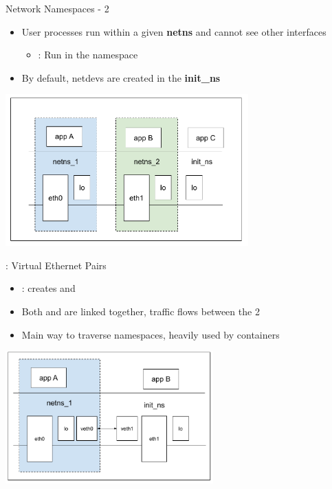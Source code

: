 \begin{frame}{Network Namespaces - 2}
	\begin{itemize}
		\item User processes run within a given \textbf{netns} and cannot see other interfaces
			\begin{itemize}
				\item {} : Run  in the  namespace
			\end{itemize}

		\item By default, netdevs are created in the \textbf{init\_ns}
	\end{itemize}
	\begin{center}
	\includegraphics[width=0.7\textwidth]{slides/networking-stack-netdevice/netns.pdf}
	\end{center}
\end{frame}

\begin{frame}{ : Virtual Ethernet Pairs}
	\begin{itemize}
		\item {} : creates  and 
		\item Both  and  are linked together, traffic flows between the 2
		\item Main way to traverse namespaces, heavily used by containers
	\end{itemize}
	\begin{center}
	\includegraphics[width=0.6\textwidth]{slides/networking-stack-netdevice/veth.pdf}
	\end{center}
\end{frame}

